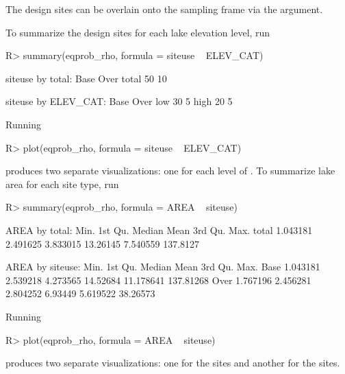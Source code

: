 \documentclass[
  shortnames]{jss}
\begin{document}
The design sites can be overlain onto the sampling frame via the
 argument.

To summarize the design sites for each lake elevation level, run

\begin{CodeChunk}
\begin{CodeInput}
R> summary(eqprob_rho, formula = siteuse ~ ELEV_CAT)
\end{CodeInput}
\begin{CodeOutput}
siteuse by total: 
      Base Over
total   50   10

siteuse by ELEV_CAT: 
     Base Over
low    30    5
high   20    5
\end{CodeOutput}
\end{CodeChunk}

Running

\begin{CodeChunk}
\begin{CodeInput}
R> plot(eqprob_rho, formula = siteuse ~ ELEV_CAT)
\end{CodeInput}
\end{CodeChunk}

produces two separate visualizations: one for each level of
. To summarize lake area for each site type, run

\begin{CodeChunk}
\begin{CodeInput}
R> summary(eqprob_rho, formula = AREA ~ siteuse)
\end{CodeInput}
\begin{CodeOutput}
AREA by total: 
          Min.  1st Qu.   Median     Mean  3rd Qu.     Max.
total 1.043181 2.491625 3.833015 13.26145 7.540559 137.8127

AREA by siteuse: 
         Min.  1st Qu.   Median     Mean   3rd Qu.      Max.
Base 1.043181 2.539218 4.273565 14.52684 11.178641 137.81268
Over 1.767196 2.456281 2.804252  6.93449  5.619522  38.26573
\end{CodeOutput}
\end{CodeChunk}

Running

\begin{CodeChunk}
\begin{CodeInput}
R> plot(eqprob_rho, formula = AREA ~ siteuse)
\end{CodeInput}
\end{CodeChunk}

produces two separate visualizations: one for the  sites and
another for the  sites.
\end{document}
